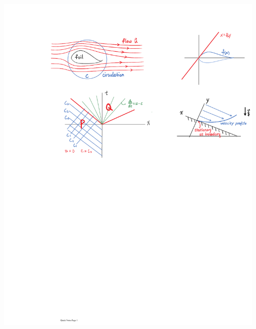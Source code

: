 \documentclass[11pt]{book}
\theoremstyle{break}
\theoremstyle{break}
\begin{document}
\begin{center}
\includegraphics[scale=1.19]{foil.pdf}
\end{center}
\end{document}
